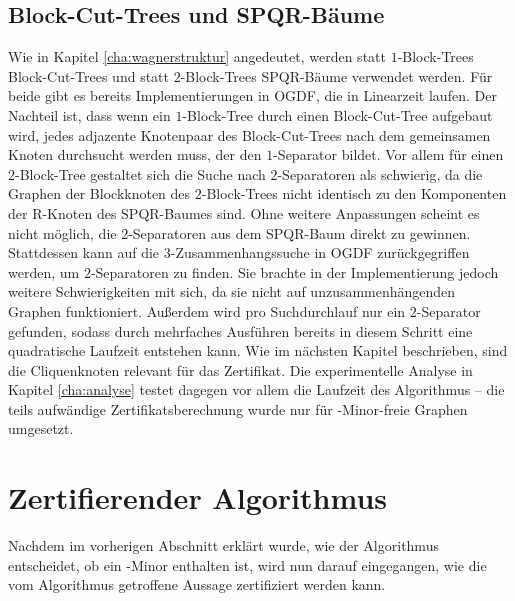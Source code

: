 \subsection{Block-Cut-Trees und SPQR-Bäume}
Wie in Kapitel \ref{cha:wagnerstruktur} angedeutet, werden statt $1$-Block-Trees Block-Cut-Trees und statt $2$-Block-Trees SPQR-Bäume verwendet werden.
Für beide gibt es bereits Implementierungen in OGDF, die in Linearzeit laufen.
Der Nachteil ist, dass wenn ein $1$-Block-Tree durch einen Block-Cut-Tree aufgebaut wird, jedes adjazente Knotenpaar des Block-Cut-Trees nach dem gemeinsamen Knoten durchsucht werden muss, der den $1$-Separator bildet.
Vor allem für einen $2$-Block-Tree gestaltet sich die Suche nach $2$-Separatoren als schwierig, da die Graphen der Blockknoten des $2$-Block-Trees nicht identisch zu den Komponenten der R-Knoten des SPQR-Baumes sind.
Ohne weitere Anpassungen scheint es nicht möglich, die $2$-Separatoren aus dem SPQR-Baum direkt zu gewinnen.
Stattdessen kann auf die $3$-Zusammenhangssuche in OGDF zurückgegriffen werden, um $2$-Separatoren zu finden.
Sie brachte in der Implementierung jedoch weitere Schwierigkeiten mit sich, da sie nicht auf unzusammenhängenden Graphen funktioniert.
Außerdem wird pro Suchdurchlauf nur ein $2$-Separator gefunden, sodass durch mehrfaches Ausführen bereits in diesem Schritt eine quadratische Laufzeit entstehen kann.
Wie im nächsten Kapitel beschrieben, sind die Cliquenknoten relevant für das Zertifikat.
Die experimentelle Analyse in Kapitel \ref{cha:analyse} testet dagegen vor allem die Laufzeit des Algorithmus -- die teils aufwändige Zertifikatsberechnung wurde nur für \kf-Minor-freie Graphen umgesetzt.


\section{Zertifierender Algorithmus}
Nachdem im vorherigen Abschnitt erklärt wurde, wie der Algorithmus entscheidet, ob ein \kf-Minor enthalten ist, wird nun darauf eingegangen, wie die vom Algorithmus getroffene Aussage zertifiziert werden kann.

